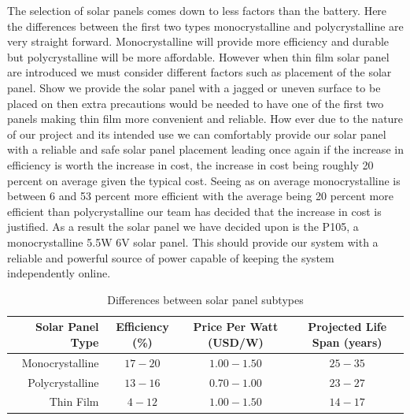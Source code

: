 The selection of solar panels comes down to less factors than the battery. Here the differences between the first two types monocrystalline and polycrystalline are very straight forward. Monocrystalline will provide more efficiency and durable but polycrystalline will be more affordable. However when thin film solar panel are introduced we must consider different factors such as placement of the solar panel. Show we provide the solar panel with a jagged or uneven surface to be placed on then extra precautions would be needed to have one of the first two panels making thin film more convenient and reliable. How ever due to the nature of our project and its intended use we can comfortably provide our solar panel with a reliable and safe solar panel placement leading once again if the increase in efficiency is worth the increase in cost, the increase in cost being roughly 20 percent on average given the typical cost. Seeing as on average monocrystalline is between 6 and 53 percent more efficient with the average being 20 percent more efficient than polycrystalline our team has decided that the increase in cost is justified. As a result the solar panel we have decided upon is the P105, a monocrystalline 5.5W 6V solar panel. This should provide our system with a reliable and powerful source of power capable of keeping the system independently online.

\begin{table}
\centering\footnotesize
\caption{Differences between solar panel subtypes}
\begin{tabular}{|r|c|c|c|}
\hline
Solar Panel Type & Efficiency (\%) & Price Per Watt (USD/W) & Projected Life Span (years) \\ 
\hline\hline
Monocrystalline & $17-20$ & $1.00-1.50$ & $25-35$ \\\hline
Polycrystalline & $13-16$ & $0.70-1.00$ & $23-27$ \\\hline
Thin Film & $4-12$ & $1.00-1.50$ & $14-17$ \\\hline
\end{tabular}
\label{tab:solar-Panel-comparison}
\end{table}

